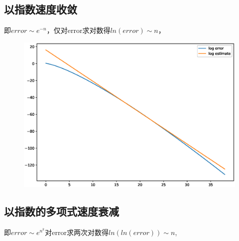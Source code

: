 \documentclass{article}
\begin{document}
    \subsection{以指数速度收敛}
    即$error\sim e^{-n}$，仅对error求对数得$ln(error)\sim n$，
    
    \begin{figure}[H]
    	\centering
    	\includegraphics[width = 16cm]{linear regression of logerror to n.eps}
    	\caption{}
    \end{figure}

    \subsection{以指数的多项式速度衰减}
    即$error\sim e^{n^{k}}$对error求两次对数得$ln(ln(error))\sim n$,
\end{document}
